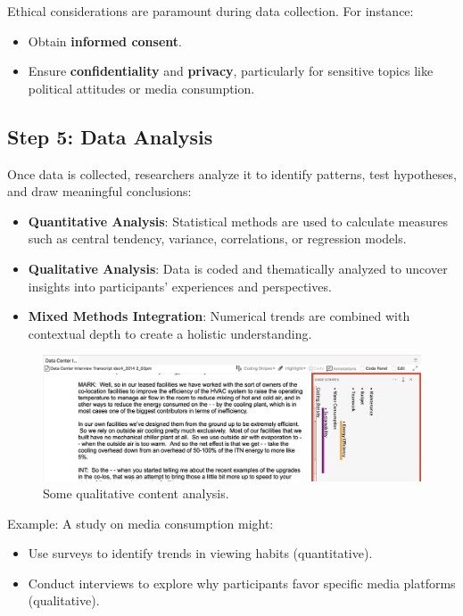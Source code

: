 \documentclass[
]{book}
\providecommand{\tightlist}{%
  \setlength{\itemsep}{0pt}\setlength{\parskip}{0pt}}
\begin{document}
Ethical considerations are paramount during data collection. For instance:

\begin{itemize}
\tightlist
\item
  Obtain \textbf{informed consent}.
\item
  Ensure \textbf{confidentiality} and \textbf{privacy}, particularly for sensitive topics like political attitudes or media consumption.
\end{itemize}

\subsection*{Step 5: Data Analysis}\label{step-5-data-analysis}

Once data is collected, researchers analyze it to identify patterns, test hypotheses, and draw meaningful conclusions:

\begin{itemize}
\tightlist
\item
  \textbf{Quantitative Analysis}: Statistical methods are used to calculate measures such as central tendency, variance, correlations, or regression models.
\item
  \textbf{Qualitative Analysis}: Data is coded and thematically analyzed to uncover insights into participants' experiences and perspectives.
\item
  \textbf{Mixed Methods Integration}: Numerical trends are combined with contextual depth to create a holistic understanding.
\end{itemize}

\begin{figure}
\centering
\includegraphics[width=1\linewidth,height=\textheight,keepaspectratio]{images/qual_content.jpg}
\caption{Some qualitative content analysis.}
\end{figure}

Example: A study on media consumption might:

\begin{itemize}
\tightlist
\item
  Use surveys to identify trends in viewing habits (quantitative).
\item
  Conduct interviews to explore why participants favor specific media platforms (qualitative).
\end{itemize}
\end{document}
